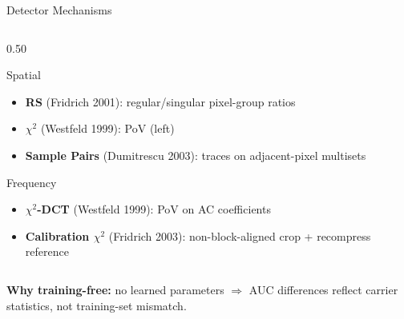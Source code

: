 \documentclass[aspectratio=169,11pt]{beamer}
\newcommand{\icite}[1]{{\footnotesize\color{umgray!85}#1}}
\begin{document}
\begin{frame}{Detector Mechanisms}
\begin{columns}[T]
\begin{column}{0.50\textwidth}
\begin{block}{Spatial}
\begin{itemize}
\item \textbf{RS} \icite{(Fridrich 2001):} regular/singular pixel-group ratios
\item \textbf{$\chi^2$} \icite{(Westfeld 1999):} PoV (left)
\item \textbf{Sample Pairs} \icite{(Dumitrescu 2003):} traces on adjacent-pixel multisets
\end{itemize}
\end{block}
\begin{block}{Frequency}
\begin{itemize}\setlength{\itemsep}{1pt}
\item \textbf{$\chi^2$-DCT} \icite{(Westfeld 1999):} PoV on AC coefficients
\item \textbf{Calibration $\chi^2$} \icite{(Fridrich 2003):} non-block-aligned crop + recompress reference
\end{itemize}
\end{block}
\end{column}
\end{columns}
\vspace{0.05cm}
{\tiny\color{umgray}\textbf{Why training-free:} no learned parameters $\Rightarrow$ AUC differences reflect carrier statistics, not training-set mismatch.}
\end{frame}

\end{document}
